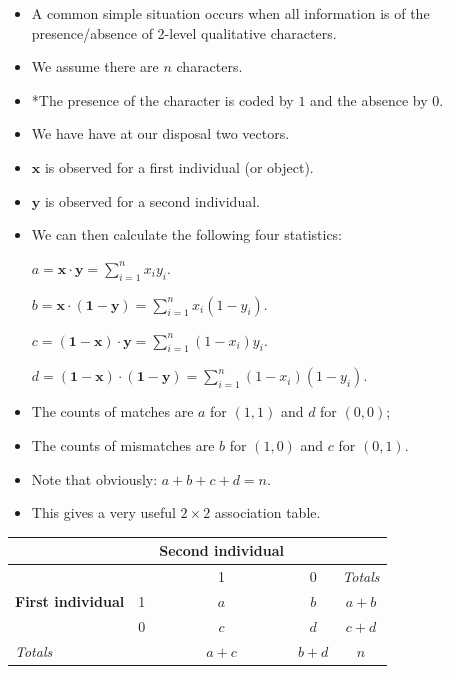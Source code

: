 \documentclass[
]{article}
\begin{document}
\begin{itemize}
\item
  A common simple situation occurs when all information is of the
  presence/absence of 2-level qualitative characters.
\item
  We assume there are \(n\) characters.
\item
  *The presence of the character is coded by \(1\) and the absence by 0.
\item
  We have have at our disposal two vectors.
\item
  \(\mathbf{x}\) is observed for a first individual (or object).
\item
  \(\mathbf{y}\) is observed for a second individual.
\item
  We can then calculate the following four statistics:

  \(a=\mathbf{x\cdot y}=\sum_{i=1}^nx_iy_i.\)

  \(b=\mathbf{x\cdot (1-y)}=\sum_{i=1}^nx_i(1-y_i).\)

  \(c=\mathbf{(1-x)\cdot y}=\sum_{i=1}^n(1-x_i)y_i.\)

  \(d=\mathbf{(1-x)\cdot (1-y)}=\sum_{i=1}^n(1-x_i)(1-y_i).\)
\item
  The counts of matches are \(a\) for \((1,1)\) and \(d\) for \((0,0)\);
\item
  The counts of mismatches are \(b\) for \((1,0)\) and \(c\) for
  \((0,1)\).
\item
  Note that obviously: \(a+b+c+d= n\).
\item
  This gives a very useful \(2 \times 2\) association table.
\end{itemize}

\begin{longtable}[]{@{}llccc@{}}
\toprule
& & Second individual & &\tabularnewline
\midrule
\endhead
& & 1 & 0 & \emph{Totals}\tabularnewline
\textbf{First individual} & 1 & \(a\) & \(b\) & \(a+b\)\tabularnewline
& 0 & \(c\) & \(d\) & \(c+d\)\tabularnewline
\emph{Totals} & & \(a+c\) & \(b+d\) & \(n\)\tabularnewline
\bottomrule
\end{longtable}
\end{document}
